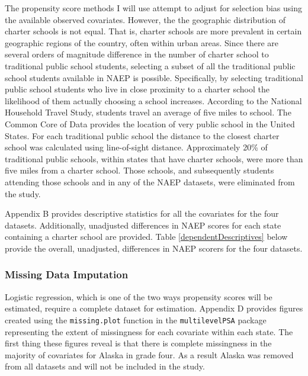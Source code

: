 \documentclass[letterpaper,12p,twoside]{article} %
\begin{document}
The propensity score methods I will use attempt to adjust for selection bias using the available observed covariates. However, the the geographic distribution of charter schools is not equal. That is, charter schools are more prevalent in certain geographic regions of the country, often within urban areas. Since there are several orders of magnitude difference in the number of charter school to traditional public school students, selecting a subset of all the traditional public school students available in NAEP is possible. Specifically, by selecting traditional public school students who live in close proximity to a charter school the likelihood of them actually choosing a school increases. According to the National Household Travel Study, students travel an average of five miles to school. The Common Core of Data \cite{ccd} provides the location of very public school in the United States. For each traditional public school the distance to the closest charter school was calculated using line-of-sight distance. Approximately 20\% of traditional public schools, within states that have charter schools, were more than five miles from a charter school. Those schools, and subsequently students attending those schools and in any of the NAEP datasets, were eliminated from the study.



Appendix B provides descriptive statistics for all the covariates for the four datasets. Additionally, unadjusted differences in NAEP scores for each state containing a charter school are provided. Table \ref{dependentDescriptives} below provide the overall, unadjusted, differences in NAEP scorers for the four datasets.



\subsubsection{Missing Data Imputation}
Logistic regression, which is one of the two ways propensity scores will be estimated, require a complete dataset for estimation. Appendix D provides figures created using the \texttt{missing.plot} function in the \texttt{multilevelPSA} package representing the extent of missingness for each covariate within each state. The first thing these figures reveal is that there is complete missingness in the majority of covariates for Alaska in grade four. As a result Alaska was removed from all datasets and will not be included in the study. 
\end{document}

